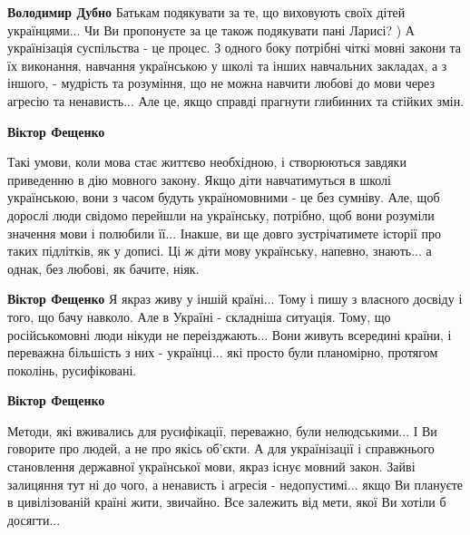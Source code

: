 \begin{itemize}
\begin{itemize}
\textbf{Володимир Дубно} Батькам подякувати за те, що виховують своїх дітей
українцями... Чи Ви пропонуєте за це також подякувати пані Ларисі? ) А
українізація суспільства - це процес. З одного боку потрібні чіткі мовні закони
та їх виконання, навчання українською у школі та інших навчальних закладах, а з
іншого, - мудрість та розуміння, що не можна навчити любові до мови через
агресію та ненависть... Але це, якщо справді прагнути глибинних та стійких
змін.

\begin{itemize}
 
\textbf{Віктор Фещенко} 

Такі умови, коли мова стає життєво необхідною, і створюються завдяки приведенню
в дію мовного закону. Якщо діти навчатимуться в школі українською, вони з часом
будуть україномовними - це без сумніву. Але, щоб дорослі люди свідомо перейшли
на українську, потрібно, щоб вони розуміли значення мови і полюбили її...
Інакше, ви ще довго зустрічатимете історії про таких підлітків, як у дописі. Ці
ж діти мову українську, напевно, знають... а однак, без любові, як бачите,
ніяк.

 
\textbf{Віктор Фещенко} Я якраз живу у іншій країні... Тому і пишу з власного досвіду і того, що бачу навколо. Але в Україні - складніша ситуація. Тому, що російськомовні люди нікуди не переізджають... Вони живуть всередині країни, і переважна більшість з них - українці... які просто були планомірно, протягом поколінь, русифіковані.

 
\textbf{Віктор Фещенко} 

Методи, які вживались для русифікації, переважно, були нелюдськими... І Ви
говорите про людей, а не про якісь об'єкти. А для українізації і справжнього
становлення державної української мови, якраз існує мовний закон. Зайві
залицяння тут ні до чого, а ненависть і агресія - недопустимі... якщо Ви
плануєте в цивілізованій країні жити, звичайно. Все залежить від мети, якої Ви
хотіли б досягти...



\end{itemize}
\end{itemize}
\end{itemize}
